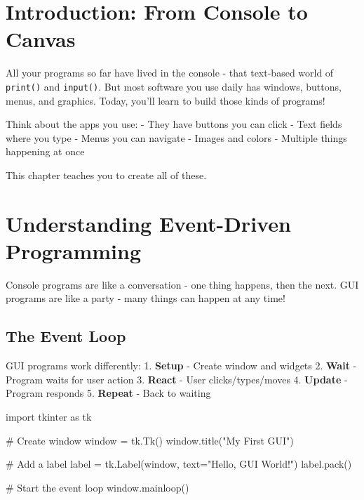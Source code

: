 \documentclass[
  letterpaper,
  DIV=11,
  numbers=noendperiod,
  oneside]{scrreprt}
\newenvironment{Shaded}{}{}
\newcommand{\CommentTok}[1]{\textcolor[rgb]{0.42,0.45,0.49}{#1}}
\newcommand{\ImportTok}[1]{\textcolor[rgb]{0.01,0.18,0.38}{#1}}
\newcommand{\NormalTok}[1]{\textcolor[rgb]{0.14,0.16,0.18}{#1}}
\newcommand{\OperatorTok}[1]{\textcolor[rgb]{0.14,0.16,0.18}{#1}}
\newcommand{\StringTok}[1]{\textcolor[rgb]{0.01,0.18,0.38}{#1}}
\begin{document}
\section{Introduction: From Console to
Canvas}\label{introduction-from-console-to-canvas}

All your programs so far have lived in the console - that text-based
world of \texttt{print()} and \texttt{input()}. But most software you
use daily has windows, buttons, menus, and graphics. Today, you'll learn
to build those kinds of programs!

Think about the apps you use: - They have buttons you can click - Text
fields where you type - Menus you can navigate - Images and colors -
Multiple things happening at once

This chapter teaches you to create all of these.

\section{Understanding Event-Driven
Programming}\label{understanding-event-driven-programming}

Console programs are like a conversation - one thing happens, then the
next. GUI programs are like a party - many things can happen at any
time!

\subsection{The Event Loop}\label{the-event-loop}

GUI programs work differently: 1. \textbf{Setup} - Create window and
widgets 2. \textbf{Wait} - Program waits for user action 3.
\textbf{React} - User clicks/types/moves 4. \textbf{Update} - Program
responds 5. \textbf{Repeat} - Back to waiting

\begin{Shaded}
\begin{Highlighting}[]
\ImportTok{import}\NormalTok{ tkinter }\ImportTok{as}\NormalTok{ tk}

\CommentTok{\# Create window}
\NormalTok{window }\OperatorTok{=}\NormalTok{ tk.Tk()}
\NormalTok{window.title(}\StringTok{"My First GUI"}\NormalTok{)}

\CommentTok{\# Add a label}
\NormalTok{label }\OperatorTok{=}\NormalTok{ tk.Label(window, text}\OperatorTok{=}\StringTok{"Hello, GUI World!"}\NormalTok{)}
\NormalTok{label.pack()}

\CommentTok{\# Start the event loop}
\NormalTok{window.mainloop()}
\end{Highlighting}
\end{Shaded}
\end{document}
